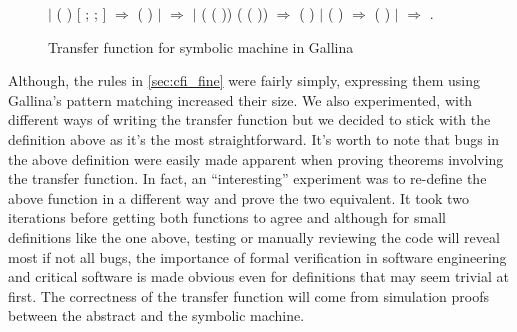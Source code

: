 \begin{figure}[!htpb]
\begin{coqdoccode}
\coqdocindent{1.00em}
\ensuremath{|}        ( \coqdocvar{\_})  [\coqdocvar{\_} ; \coqdocvar{\_} ; ]  \ensuremath{\Rightarrow} \coqdoceol
\coqdocindent{2.00em}
 (  )\coqdoceol
\coqdocindent{1.00em}
\ensuremath{|}      \coqdocvar{\_}  \coqdocvar{\_}  \coqdocvar{\_}  \ensuremath{\Rightarrow} \coqdoceol
\coqdocindent{1.00em}
\ensuremath{|}     \coqdocvar{\_}    ( ( ))  ( ( ))  \coqdocvar{\_}  \ensuremath{\Rightarrow} \coqdoceol
\coqdocindent{2.00em}
      (  )  \coqdoceol
\coqdocindent{1.00em}
\ensuremath{|}     \coqdocvar{\_}      ( \coqdocvar{\_})  \coqdocvar{\_}  \ensuremath{\Rightarrow} \coqdoceol
\coqdocindent{2.00em}
 (  )\coqdoceol
\coqdocindent{1.00em}
\ensuremath{|}  \coqdocvar{\_} \coqdocvar{\_} \coqdocvar{\_} \coqdocvar{\_} \ensuremath{\Rightarrow} \coqdoceol
\coqdocindent{1.00em}
.\coqdoceol
\coqdocemptyline
\coqdocnoindent
\end{coqdoccode}
\caption{Transfer function for symbolic machine in Gallina}
\label{fig:transfer_coq}
\end{figure}


Although, the rules in \ref{sec:cfi_fine} were fairly simply, expressing them
using Gallina's pattern matching increased their size. We also experimented,
with different ways of writing the transfer function but we decided to stick
with the definition above as it's the most straightforward. It's worth to note
that bugs in the above definition were easily made apparent when proving
theorems involving the transfer function. In fact, an ``interesting'' experiment
was to re-define the above function in a different way and prove the two 
equivalent. It took two iterations before getting both functions to agree
and although for small definitions like the one above, testing or manually
reviewing the code will reveal most if not all bugs, the importance of formal
verification in software engineering and critical software is made obvious
even for definitions that may seem trivial at first. The correctness of the
transfer function will come from simulation proofs between the abstract
and the symbolic machine.


